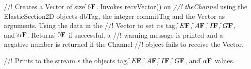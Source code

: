 //! Creates a Vector of size \f$6{\bf F}$. Invokes recvVector() on  {\em
//! theChannel} using the ElasticSection2D objects \p dbTag, the integer
\p commitTag and the Vector as arguments. Using the data in the
//! Vector to set its \p tag, \f$E{\bf F}$, \f$A{\bf F}$, \f$I{\bf F}$, \f$G{\bf F}$, and \f$\alpha{\bf F}$. Returns \f$0{\bf F}$ if successful, a
//! warning message is printed and a negative number is returned if the Channel 
//! object fails to receive the Vector.

//! Prints to the stream \p s the objects \p tag, \f$E{\bf F}$, \f$A{\bf F}$, \f$I{\bf F}$, \f$G{\bf F}$, and
\f$\alpha{\bf F}$ values.



